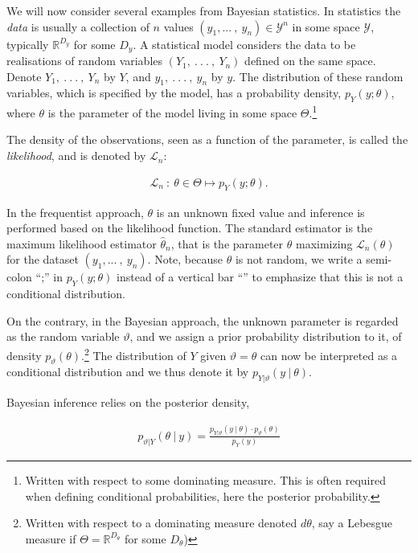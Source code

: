 We will now consider several examples from Bayesian statistics. In
statistics the \emph{data} is usually a collection of \(n\) values
\(\left( y_{1},...\ ,\ y_{n} \right) \in \mathcal{Y}^{n}\) in some space
\(\mathcal{Y}\), typically \(\mathbb{R}^{D_{y}}\) for some \(D_{y}\). A
statistical model considers the data to be realisations of random
variables \((Y_{1},\ .\ .\ .\ ,\ Y_{n})\) deﬁned on the same space.
Denote \(Y_{1},\ .\ .\ .\ ,\ Y_{n}\) by \(Y\), and
\(y_{1},\ .\ .\ .\ ,\ y_{n}\) by \(y\). The distribution of these random
variables, which is speciﬁed by the model, has a probability density,
\(p_{Y}(y;\theta)\), where \(\theta\) is the parameter of the model
living in some space \(\Theta\).\footnote{Written with respect to some
  dominating measure. This is often required when defining conditional
  probabilities, here the posterior probability.}

The density of the observations, seen as a function of the parameter, is
called the \emph{likelihood}, and is denoted by \(\mathcal{L}_{n}\):

\begin{align}\mathcal{L}_{n}\ :\ \theta \in \Theta \mapsto p_{Y}(y;\theta).\end{align}

In the frequentist approach, \(\theta\) is an unknown ﬁxed value and
inference is performed based on the likelihood function. The standard
estimator is the maximum likelihood estimator
\({\widehat{\theta}}_{n}\), that is the parameter \(\theta\) maximizing
\(\mathcal{L}_{n}(\theta)\) for the dataset
\(\left( y_{1},...\ ,\ y_{n} \right)\). Note, because \(\theta\) is not
random, we write a semi-colon ``;'' in \(p_{Y}(y;\theta)\) instead of a
vertical bar ``\textbar'' to emphasize that this is not a conditional
distribution.

On the contrary, in the Bayesian approach, the unknown parameter is
regarded as the random variable \(\vartheta\), and we assign a prior
probability distribution to it, of density
\(p_{\vartheta}(\theta)\).\footnote{Written with respect to a dominating
  measure denoted \(d\theta\), say a Lebesgue measure if
  \(\Theta = \mathbb{R}^{D_{\theta}}\) for some \(D_{\theta}\))} The
distribution of \(Y\) given \(\vartheta = \theta\) can now be
interpreted as a conditional distribution and we thus denote it by
\(p_{Y|\vartheta}(y\ |\ \theta)\).

Bayesian inference relies on the posterior density,

\begin{align}p_{\vartheta|Y}(\theta\ |\ y) = \frac{p_{Y|\vartheta}(y\ |\ \theta) \cdot p_{\vartheta}(\theta)}{p_{Y}(y)}\end{align}


